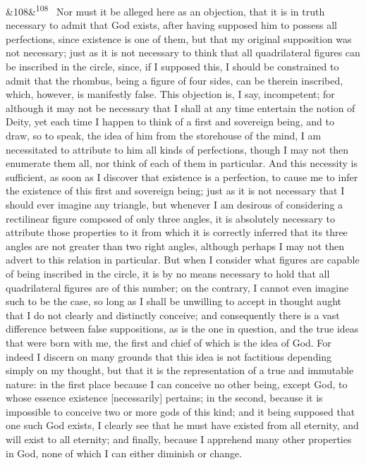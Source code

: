 \documentclass[12pt]{article}
\newcommand{\para}[1][]{\par\noindent\ifx&#1&\else\textsuperscript{\footnotesize #1}~\fi}
\begin{document}
\para[108] Nor must it be alleged here as an objection, that it is in truth necessary to admit that God exists, after having supposed him to possess all perfections, since existence is one of them, but that my original supposition was not necessary; just as it is not necessary to think that all quadrilateral figures can be inscribed in the circle, since, if I supposed this, I should be constrained to admit that the rhombus, being a figure of four sides, can be therein inscribed, which, however, is manifestly false. This objection is, I say, incompetent; for although it may not be necessary that I shall at any time entertain the notion of Deity, yet each time I happen to think of a first and sovereign being, and to draw, so to speak, the idea of him from the storehouse of the mind, I am necessitated to attribute to him all kinds of perfections, though I may not then enumerate them all, nor think of each of them in particular. And this necessity is sufficient, as soon as I discover that existence is a perfection, to cause me to infer the existence of this first and sovereign being; just as it is not necessary that I should ever imagine any triangle, but whenever I am desirous of considering a rectilinear figure composed of only three angles, it is absolutely necessary to attribute those properties to it from which it is correctly inferred that its three angles are not greater than two right angles, although perhaps I may not then advert to this relation in particular. But when I consider what figures are capable of being inscribed in the circle, it is by no means necessary to hold that all quadrilateral figures are of this number; on the contrary, I cannot even imagine such to be the case, so long as I shall be unwilling to accept in thought aught that I do not clearly and distinctly conceive; and consequently there is a vast difference between false suppositions, as is the one in question, and the true ideas that were born with me, the first and chief of which is the idea of God. For indeed I discern on many grounds that this idea is not factitious depending simply on my thought, but that it is the representation of a true and immutable nature: in the first place because I can conceive no other being, except God, to whose essence existence [necessarily] pertains; in the second, because it is impossible to conceive two or more gods of this kind; and it being supposed that one such God exists, I clearly see that he must have existed from all eternity, and will exist to all eternity; and finally, because I apprehend many other properties in God, none of which I can either diminish or change.
\end{document}

